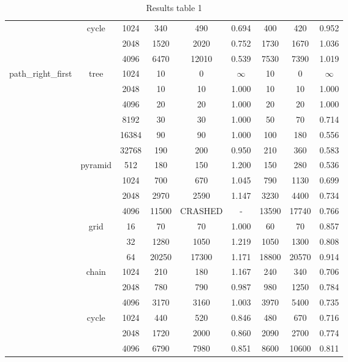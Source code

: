\begin{table}[ht]
{\begin{tabular}{c|c|c|c|c|c|c|c|c}
   \cline{2-9}
   &  \multirow{3}{*}{cycle} &  1024 &  340 & 490 &  0.694  & 400 & 420 &  0.952 \\
   &  &  2048 &  1520 & 2020 &  0.752  & 1730 & 1670 &  1.036 \\
   &  &  4096 &  6470 & 12010 &  0.539  & 7530 & 7390 &  1.019 \\
   \cline{2-9}
   \hline
   \multirow{19}{*}{path\_right\_first} &  \multirow{6}{*}{tree} &  1024 &  10 & 0 &  $\infty$  & 10 & 0 &  $\infty$ \\
   &  &  2048 &  10 & 10 &  1.000  & 10 & 10 &  1.000 \\
   &  &  4096 &  20 & 20 &  1.000  & 20 & 20 &  1.000 \\
   &  &  8192 &  30 & 30 &  1.000  & 50 & 70 &  0.714 \\
   &  &  16384 &  90 & 90 &  1.000  & 100 & 180 &  0.556 \\
   &  &  32768 &  190 & 200 &  0.950  & 210 & 360 &  0.583 \\
   \cline{2-9}
   &  \multirow{4}{*}{pyramid} &  512 &  180 & 150 &  1.200  & 150 & 280 &  0.536 \\
   &  &  1024 &  700 & 670 &  1.045  & 790 & 1130 &  0.699 \\
   &  &  2048 &  2970 & 2590 &  1.147  & 3230 & 4400 &  0.734 \\
   &  &  4096 &  11500 & CRASHED &  -  & 13590 & 17740 &  0.766 \\
   \cline{2-9}
   &  \multirow{3}{*}{grid} &  16 &  70 & 70 &  1.000  & 60 & 70 &  0.857 \\
   &  &  32 &  1280 & 1050 &  1.219  & 1050 & 1300 &  0.808 \\
   &  &  64 &  20250 & 17300 &  1.171  & 18800 & 20570 &  0.914 \\
   \cline{2-9}
   &  \multirow{3}{*}{chain} &  1024 &  210 & 180 &  1.167  & 240 & 340 &  0.706 \\
   &  &  2048 &  780 & 790 &  0.987  & 980 & 1250 &  0.784 \\
   &  &  4096 &  3170 & 3160 &  1.003  & 3970 & 5400 &  0.735 \\
   \cline{2-9}
   &  \multirow{3}{*}{cycle} &  1024 &  440 & 520 &  0.846  & 480 & 670 &  0.716 \\
   &  &  2048 &  1720 & 2000 &  0.860  & 2090 & 2700 &  0.774 \\
   &  &  4096 &  6790 & 7980 &  0.851  & 8600 & 10600 &  0.811 \\
   \cline{2-9}
   \hline
\end{tabular}
}
\caption{Results table 1}
\end{table}

